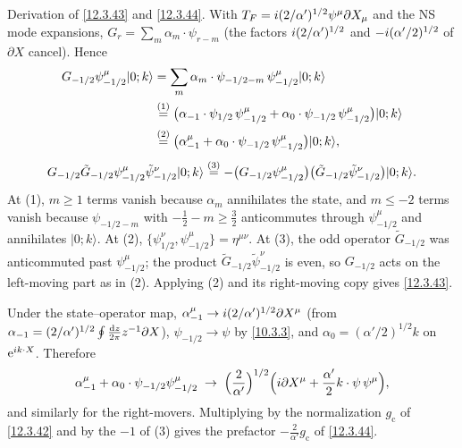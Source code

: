 \begin{tcolorbox}[breakable]
	\begin{remark}
		Derivation of \eqref{12.3.43} and \eqref{12.3.44}. With $T_{F}=i(2/\alpha')^{1/2}\psi^{\mu}\partial X_{\mu}$ and the NS mode expansions, $G_{r}=\sum_{m}\alpha_{m}\cdot\psi_{r-m}$ (the factors $i(2/\alpha')^{1/2}$ and $-i(\alpha'/2)^{1/2}$ of $\partial X$ cancel). Hence
		\begin{align*}
			G_{-1/2}\psi^{\mu}_{-1/2}\lvert0;k\rangle
			&=\sum_{m}\alpha_{m}\cdot\psi_{-1/2-m}\,\psi^{\mu}_{-1/2}\lvert0;k\rangle\\
			&\overset{(1)}{=} \bigl(\alpha_{-1}\cdot\psi_{1/2}\,\psi^{\mu}_{-1/2}+\alpha_{0}\cdot\psi_{-1/2}\,\psi^{\mu}_{-1/2}\bigr)\lvert0;k\rangle\\
			&\overset{(2)}{=} \bigl(\alpha^{\mu}_{-1}+\alpha_{0}\cdot\psi_{-1/2}\,\psi^{\mu}_{-1/2}\bigr)\lvert0;k\rangle ,
		\end{align*}
		\begin{align*}
			G_{-1/2}\tilde G_{-1/2}\psi^{\mu}_{-1/2}\tilde\psi^{\nu}_{-1/2}\lvert0;k\rangle
			\overset{(3)}{=} -\bigl(G_{-1/2}\psi^{\mu}_{-1/2}\bigr)\bigl(\tilde G_{-1/2}\tilde\psi^{\nu}_{-1/2}\bigr)\lvert0;k\rangle .
		\end{align*}
		At (1), $m\ge1$ terms vanish because $\alpha_{m}$ annihilates the state, and $m\le-2$ terms vanish because $\psi_{-1/2-m}$ with $-\frac12-m\ge\frac32$ anticommutes through $\psi^{\mu}_{-1/2}$ and annihilates $\lvert0;k\rangle$. At (2), $\{\psi^{\nu}_{1/2},\psi^{\mu}_{-1/2}\}=\eta^{\mu\nu}$. At (3), the odd operator $\tilde G_{-1/2}$ was anticommuted past $\psi^{\mu}_{-1/2}$; the product $\tilde G_{-1/2}\tilde\psi^{\nu}_{-1/2}$ is even, so $G_{-1/2}$ acts on the left-moving part as in (2). Applying (2) and its right-moving copy gives \eqref{12.3.43}.

		Under the state--operator map, $\alpha^{\mu}_{-1}\to i(2/\alpha')^{1/2}\partial X^{\mu}$ (from $\alpha_{-1}=(2/\alpha')^{1/2}\oint\frac{\mathrm{d} z}{2\pi}z^{-1}\partial X$), $\psi_{-1/2}\to\psi$ by \eqref{10.3.3}, and $\alpha_{0}=(\alpha'/2)^{1/2}k$ on $\mathrm{e}^{i k\cdot X}$. Therefore
		\begin{align*}
			\alpha^{\mu}_{-1}+\alpha_{0}\cdot\psi_{-1/2}\psi^{\mu}_{-1/2}
			\;\to\;\Bigl(\frac{2}{\alpha'}\Bigr)^{1/2}\Bigl(i\partial X^{\mu}+\frac{\alpha'}{2}k\cdot\psi\,\psi^{\mu}\Bigr) ,
		\end{align*}
		and similarly for the right-movers. Multiplying by the normalization $g_{\mathrm c}$ of \eqref{12.3.42} and by the $-1$ of (3) gives the prefactor $-\frac{2}{\alpha'}g_{\mathrm c}$ of \eqref{12.3.44}.
	\end{remark}
\end{tcolorbox}
